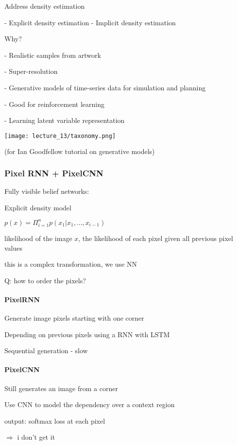 Address density estimation 

- Explicit density estimation
- Implicit density estimation

Why?

- Realistic samples from artwork 

- Super-resolution

- Generative models of time-series data for simulation and planning

  - Good for reinforcement learning

- Learning latent variable representation

  \texttt{[image: lecture\_13/taxonomy.png]}

(for Ian Goodfellow tutorial on generative models)

\subsubsection{Pixel RNN + PixelCNN}

Fully visible belief networks:

Explicit density model

$p(x) = \Pi_{i=1}^n p(x_1 | x_1,\dots, x_{i-1})$ 

likelihood of the image $x$, the likelihood of each pixel given all previous pixel values

this is a complex transformation, we use NN 

Q: how to order the pixels?

\paragraph{PixelRNN}

Generate image pixels starting with one corner

Depending on previous pixels using a RNN with LSTM

Sequential generation - slow

\paragraph{PixelCNN}

Still generates an image from a corner

Use CNN to model the dependency over a context region

output: softmax loss at each pixel

$\Rightarrow$ i don't get it



